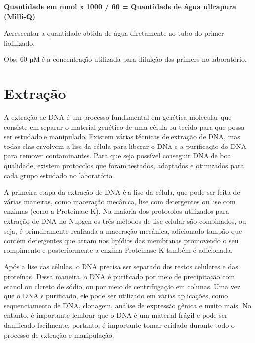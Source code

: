 \documentclass[
  letterpaper,
  DIV=11,
  numbers=noendperiod]{scrreprt}
\begin{document}
\textbf{Quantidade em nmol x 1000 / 60 = Quantidade de água ultrapura
(Milli-Q)}

Acrescentar a quantidade obtida de água diretamente no tubo do primer
liofilizado.

Obs: 60 µM é a concentração utilizada para diluição dos primers no
laboratório.

\hypertarget{extrauxe7uxe3o}{%
\chapter{Extração}\label{extrauxe7uxe3o}}

A extração de DNA é um processo fundamental em genética molecular que
consiste em separar o material genético de uma célula ou tecido para que
possa ser estudado e manipulado. Existem várias técnicas de extração de
DNA, mas todas elas envolvem a lise da célula para liberar o DNA e a
purificação do DNA para remover contaminantes. Para que seja possível
conseguir DNA de boa qualidade, existem protocolos que foram testados,
adaptados e otimizados para cada grupo estudado no laboratório.

A primeira etapa da extração de DNA é a lise da célula, que pode ser
feita de várias maneiras, como maceração mecânica, lise com detergentes
ou lise com enzimas (como a Proteinase K). Na maioria dos protocolos
utilizados para extração de DNA no Nupgen os três métodos de lise
celular são combinados, ou seja, é primeiramente realizada a maceração
mecânica, adicionado tampão que contém detergentes que atuam nos
lipídios das membranas promovendo o seu rompimento e posteriormente a
enzima Proteinase K também é adicionada.

Após a lise das células, o DNA precisa ser separado dos restos celulares
e das proteínas. Dessa maneira, o DNA é purificado por meio de
precipitação com etanol ou cloreto de sódio, ou por meio de
centrifugação em colunas. Uma vez que o DNA é purificado, ele pode ser
utilizado em várias aplicações, como sequenciamento de DNA, clonagem,
análise de expressão gênica e muito mais. No entanto, é importante
lembrar que o DNA é um material frágil e pode ser danificado facilmente,
portanto, é importante tomar cuidado durante todo o processo de extração
e manipulação.
\end{document}
